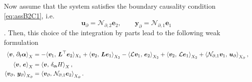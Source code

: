 Now assume that the system satisfies the boundary causality condition \eqref{eq:assB2C1}, i.e.  
\begin{equation*}
\bm{u}_\partial=\mathcal{N}_{\partial, 2} \bm{e}_2, \qquad \bm{y}_\partial=\mathcal{N}_{\partial, 1} \bm{e}_1
\end{equation*}. 
Then, this choice of the integration by parts lead to the following weak formulation
\begin{equation}\label{eq:weak_sys_intJ1}
\begin{aligned}
\inner[X]{\bm{v}}{\partial_t \bm{\alpha}} &=   -  \langle{\bm{v}_1}, \,{\bm{L}^\top \bm{e}_2}\rangle_{X_1} + \inner[X_2]{\bm{v}_2}{\bm{L}\bm{e}_1} -\inner[X_2]{\mathcal{L}\bm{v}_1}{\bm{e}_2} + \inner[X_2]{\bm{v}_2}{\mathcal{L}\bm{e}_1} + \inner[X_\partial]{\mathcal{N}_{\partial, 1} \bm{v}_1}{\bm{u}_\partial}, \\
\inner[X]{\bm{v}}{\bm{e}}&=\inner[X]{\bm{v}}{\delta_{\bm{\alpha}} H}, \\
\inner[X_\partial]{\bm{v}_\partial}{\bm{y}_\partial} &= \inner[X_\partial]{\bm{v}_\partial}{\mathcal{N}_{\partial, 1}\bm{e}_2}.
\end{aligned}
\end{equation}

